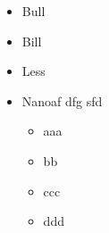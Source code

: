 \begin{itemize}
    \item             Bull
       \item        Bill
       \item        Less
        \item    Nanoaf dfg sfd
        \begin{itemize}
            \item   aaa
            \item        bb
            \item        ccc
            \item    ddd
        \end{itemize}
\end{itemize}
